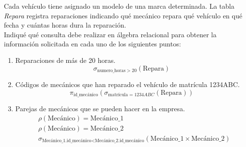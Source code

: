 \begin{ejercicio}
    Cada vehículo tiene asignado un modelo de una marca determinada. La tabla \emph{Repara} registra reparaciones indicando qué mecánico repara qué vehículo en qué fecha y cuántas horas dura la reparación.\\

    Indiqué qué consulta debe realizar en álgebra relacional para obtener la información solicitada en cada uno de los siguientes puntos:
    \begin{enumerate}
        \item Reparaciones de más de 20 horas.
        \begin{equation*}
            \sigma_{\text{numero\_horas} > 20}(\text{Repara})
        \end{equation*}
        \item Códigos de mecánicos que han reparado el vehículo de matrícula 1234ABC.
        \begin{equation*}
            \pi_{\text{id\_mecánico}}(\sigma_{\text{matrícula} = 1234ABC}(\text{Repara}))
        \end{equation*}
        \item Parejas de mecánicos que se pueden hacer en la empresa.
        \begin{align*}
            &\rho(\text{Mecánico})=\text{Mecánico\_1} \\
            &\rho(\text{Mecánico})=\text{Mecánico\_2} \\
            &\sigma_{\text{Mecánico\_1.id\_mecánico}< \text{Mecánico\_2.id\_mecánico}}(\text{Mecánico\_1}\times \text{Mecánico\_2})
        \end{align*}


\end{enumerate}
\end{ejercicio}
